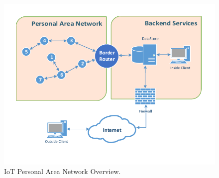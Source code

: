 \begin{figure}
  \centering
  \includegraphics[width=0.8\linewidth]{figures/Network_Overview.pdf}
  \caption{IoT Personal Area Network Overview.}
  \label{fig:net_overview_small}
\end{figure}
